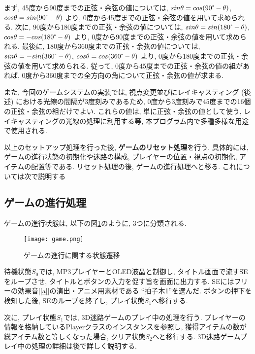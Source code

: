 \documentclass[10pt]{jsarticle}
\begin{document}
\begin{screen}
まず, 45度から90度までの正弦・余弦の値については, $ sin \theta = cos ( 90\tcdegree - \theta ) $,  
$cos \theta = sin ( 90\tcdegree - \theta ) $ より, 0度から45度までの正弦・余弦の値を用いて求められる.
次に, 90度から180度までの正弦・余弦の値については, $ sin \theta = sin ( 180\tcdegree - \theta ) $,  
$cos \theta = - cos ( 180\tcdegree - \theta ) $ より, 0度から90度までの正弦・余弦の値を用いて求められる.
最後に, 180度から360度までの正弦・余弦の値については, $ sin \theta = - sin ( 360\tcdegree - \theta ) $,  
$cos \theta = cos ( 360\tcdegree - \theta ) $ より, 0度から180度までの正弦・余弦の値を用いて求められる.
従って, 0度から45度までの正弦・余弦の値の組があれば, 0度から360度までの全方向の角について正弦・余弦の値が求まる.
\end{screen}

また, 今回のゲームシステムの実装では, 視点変更並びにレイキャスティング (後述) における光線の間隔が3度刻みであるため, 
0度から3度刻みで45度までの16個の正弦・余弦の組だけでよい.
これらの値は, 単に正弦・余弦の値として使う, レイキャスティングの光線の処理に利用する等, 
本プログラム内で多種多様な用途で使用される.

以上のセットアップ処理を行った後, \textbf{ゲームのリセット処理}を行う.
具体的には, ゲームの進行状態の初期化や迷路の構成, プレイヤーの位置・視点の初期化, アイテムの配置等である.
リセット処理の後, ゲームの進行処理へと移る.
これについては次で説明する

\subsection{ゲームの進行処理}

ゲームの進行状態は, 以下の図\ref{game}のように, 3つに分類される.

\begin{figure}[h]
	\centering
	\texttt{[image: game.png]}
	\caption{ゲームの進行に関する状態遷移}
 	\label{game}
\end{figure}

待機状態$S_0$では, MP3プレイヤーとOLED液晶と制御し, タイトル画面で流すSEをループさせ, 
タイトルとボタンの入力を促す旨を画面に出力する.
SEにはフリーの効果音[\ref{a}]の演出・アニメ用素材である ``拍子木1''を選んだ.
ボタンの押下を検知した後, SEのループを終了し, プレイ状態$S_1$へ移行する.

次に, プレイ状態$S_1$では, 3D迷路ゲームのプレイ中の処理を行う.
プレイヤーの情報を格納しているPlayerクラスのインスタンスを参照し, 獲得アイテムの数が総アイテム数と等しくなった場合,
クリア状態$S_2$へと移行する.
3D迷路ゲームプレイ中の処理の詳細は後で詳しく説明する.
\end{document}
